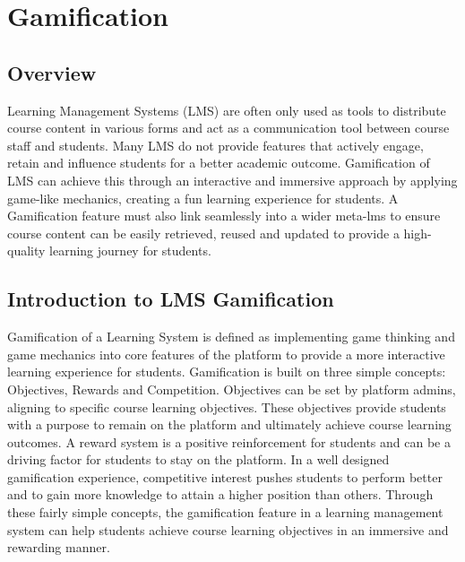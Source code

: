 \section{Gamification}
\subsection{Overview}
Learning Management Systems (LMS) are often only used as tools to distribute course content in various forms and act as a communication tool between course staff and students. Many LMS do not provide features that actively engage, retain and influence students for a better academic outcome.
Gamification of LMS can achieve this through an interactive and immersive approach by applying game-like mechanics, creating a fun learning experience for students. 
A Gamification feature must also link seamlessly into a wider meta-lms to ensure course content can be easily retrieved, reused and updated to provide a high-quality learning journey for students.

\subsection{Introduction to LMS Gamification}
Gamification of a Learning System is defined as implementing game thinking and game mechanics into core features of the platform to provide a more interactive learning experience for students. Gamification is built on three simple concepts: Objectives, Rewards and Competition. Objectives can be set by platform admins, aligning to specific course learning objectives. 
These objectives provide students with a purpose to remain on the platform and ultimately achieve course learning outcomes. A reward system is a positive reinforcement for students and can be a driving factor for students to stay on the platform. In a well designed gamification experience, competitive interest pushes students to perform better and to gain more knowledge to attain a higher position than others. 
Through these fairly simple concepts, the gamification feature in a learning management system can help students achieve course learning objectives in an immersive and rewarding manner.

\newpage

